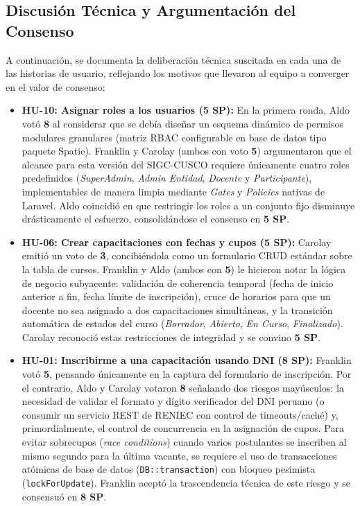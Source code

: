 \subsection{Discusión Técnica y Argumentación del Consenso}

A continuación, se documenta la deliberación técnica suscitada en cada una de las historias de usuario, reflejando los motivos que llevaron al equipo a converger en el valor de consenso:

\begin{itemize}
    \item \textbf{HU-10: Asignar roles a los usuarios (5 SP):} En la primera ronda, Aldo votó \textbf{8} al considerar que se debía diseñar un esquema dinámico de permisos modulares granulares (matriz RBAC configurable en base de datos tipo paquete Spatie). Franklin y Carolay (ambos con voto \textbf{5}) argumentaron que el alcance para esta versión del SIGC-CUSCO requiere únicamente cuatro roles predefinidos (\textit{SuperAdmin}, \textit{Admin Entidad}, \textit{Docente} y \textit{Participante}), implementables de manera limpia mediante \textit{Gates} y \textit{Policies} nativas de Laravel. Aldo coincidió en que restringir los roles a un conjunto fijo disminuye drásticamente el esfuerzo, consolidándose el consenso en \textbf{5 SP}.
    
    \item \textbf{HU-06: Crear capacitaciones con fechas y cupos (5 SP):} Carolay emitió un voto de \textbf{3}, concibiéndola como un formulario CRUD estándar sobre la tabla de cursos. Franklin y Aldo (ambos con \textbf{5}) le hicieron notar la lógica de negocio subyacente: validación de coherencia temporal (fecha de inicio anterior a fin, fecha límite de inscripción), cruce de horarios para que un docente no sea asignado a dos capacitaciones simultáneas, y la transición automática de estados del curso (\textit{Borrador}, \textit{Abierto}, \textit{En Curso}, \textit{Finalizado}). Carolay reconoció estas restricciones de integridad y se convino \textbf{5 SP}.
    
    \item \textbf{HU-01: Inscribirme a una capacitación usando DNI (8 SP):} Franklin votó \textbf{5}, pensando únicamente en la captura del formulario de inscripción. Por el contrario, Aldo y Carolay votaron \textbf{8} señalando dos riesgos mayúsculos: la necesidad de validar el formato y dígito verificador del DNI peruano (o consumir un servicio REST de RENIEC con control de timeouts/caché) y, primordialmente, el control de concurrencia en la asignación de cupos. Para evitar sobrecupos (\textit{race conditions}) cuando varios postulantes se inscriben al mismo segundo para la última vacante, se requiere el uso de transacciones atómicas de base de datos (\texttt{DB::transaction}) con bloqueo pesimista (\texttt{lockForUpdate}). Franklin aceptó la trascendencia técnica de este riesgo y se consensuó en \textbf{8 SP}.
    

\end{itemize}
